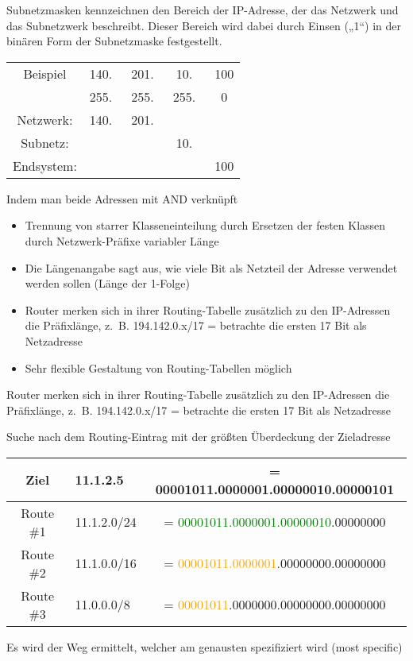 Subnetzmasken kennzeichnen den Bereich der IP-Adresse, der das Netzwerk und das Subnetzwerk beschreibt.
Dieser Bereich wird dabei durch Einsen („1“) in der binären Form der Subnetzmaske festgestellt.
\begin{center}
    \begin{tabular}{c|c c c c}
        Beispiel & 140.\ & 201.\ & 10.\  & 100 \tabularnewline
        & 255.\ & 255.\ & 255.\ & 0 \tabularnewline
        Netzwerk: & 140.\ & 201.\ & & \tabularnewline
        Subnetz: & & & 10.\ & \tabularnewline
        Endsystem: & & & & 100 \tabularnewline
    \end{tabular}
\end{center}

Indem man beide Adressen mit AND verknüpft

\begin{itemize}
    \item Trennung von starrer Klasseneinteilung durch Ersetzen der festen Klassen durch Netzwerk-Präfixe variabler Länge
    \item Die Längenangabe sagt aus, wie viele Bit als Netzteil der Adresse verwendet werden sollen (Länge der 1-Folge)
    \item Router merken sich in ihrer Routing-Tabelle zusätzlich zu den IP-Adressen die Präfixlänge, z.\ B. 194.142.0.x/17 = betrachte die ersten 17 Bit als Netzadresse
    \item Sehr flexible Gestaltung von Routing-Tabellen möglich
\end{itemize}

Router merken sich in ihrer Routing-Tabelle zusätzlich zu den IP-Adressen die Präfixlänge, z.\ B. 194.142.0.x/17 = betrachte die ersten 17 Bit als Netzadresse

Suche nach dem Routing-Eintrag mit der größten Überdeckung der Zieladresse
\begin{center}
    \begin{tabular}{c l c}
        Ziel & 11.1.2.5 & = 00001011.0000001.00000010.00000101 \tabularnewline
        \hline
        Route \#1 & 11.1.2.0/24 & = \textcolor{green}{00001011.0000001.00000010}.00000000 \tabularnewline
        Route \#2 & 11.1.0.0/16 & = \textcolor{orange}{00001011.0000001}.00000000.00000000 \tabularnewline
        Route \#3 & 11.0.0.0/8 & = \textcolor{orange}{00001011}.0000000.00000000.00000000 \tabularnewline
    \end{tabular}
\end{center}
Es wird der Weg ermittelt, welcher am genausten spezifiziert wird (most specific)

